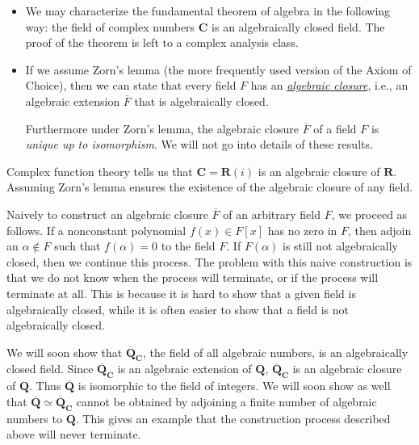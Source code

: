 \documentclass[11pt]{article}
\newcommand{\R}{\mathbf{R}}
\newcommand{\Q}{\mathbf{Q}}
\newcommand{\C}{\mathbf{C}}
\newcommand{\df}[1]{\ul{\textit{\textsf{#1}}}}
\newcommand{\clos}[1]{\overline{#1}}
\begin{document}
\begin{itemize}
    \item We may characterize the fundamental theorem of algebra in the following way: the field of complex numbers $\C$ is an algebraically closed field. The proof of the theorem is left to a complex analysis class.
    \item If we assume Zorn's lemma (the more frequently used version of the Axiom of Choice), then we can state that every field $F$ has an \df{algebraic closure}, i.e., an algebraic extension $\clos{F}$ that is algebraically closed.
    
    Furthermore under Zorn's lemma, the algebraic closure $\clos{F}$ of a field $F$ is \emph{unique up to isomorphism}. We will not go into details of these results.
\end{itemize}   
\begin{framed}
    Complex function theory tells us that $\C = \R(i)$ is an algebraic closure of $\R$. Assuming Zorn's lemma ensures the existence of the algebraic closure of any field. 

    Naively to construct an algebraic closure $\clos{F}$ of an arbitrary field $F$, we proceed as follows. If a nonconstant polynomial $f(x) \in F[x]$ has no zero in $F$, then adjoin an $\alpha \notin F$ such that $f(\alpha) = 0$ to the field $F$. If $F(\alpha)$ is still not algebraically closed, then we continue this process. The problem with this naive construction is that we do not know when the process will terminate, or if the process will terminate at all. This is because it is hard to show that a given field is algebraically closed, while it is often easier to show that a field is not algebraically closed. 
    
    We will soon show that $\clos{\Q}_\C$, the field of all algebraic numbers, is an algebraically closed field. Since $\clos{\Q}_\C$ is an algebraic extension of $\Q$, $\clos{\Q}_\C$ is an algebraic closure of $\Q$. Thus $\clos{\Q}$ is isomorphic to the field of integers. We will soon show as well that $\clos{\Q} \simeq \clos{\Q}_\C$ cannot be obtained by adjoining a finite number of algebraic numbers to $\Q$. This gives an example that the construction process described above will never terminate.
\end{framed}
\end{document}
